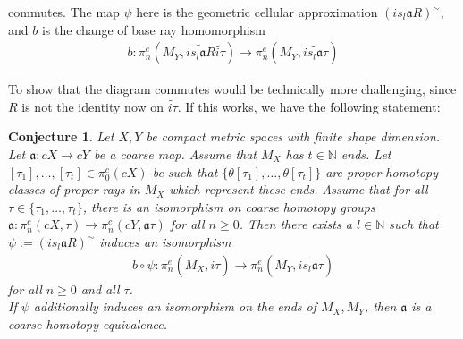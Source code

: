 \documentclass[a4paper,11pt]{article}
\theoremstyle{definition}
\theoremstyle{plain}
\newtheorem{conjecture}[definition]{Conjecture}
\theoremstyle{remark}
\begin{document}
{\begin{figure}[H]
\center
{}
\end{figure}
commutes. The map $\psi$ here is the geometric cellular approximation $(is_{l}\mathfrak{a}R)^{\sim}$, and $b$ is the change of base ray homomorphism 
\begin{align*}
b: \pi_{n}^{e}(M_Y,\widetilde{is_{l}\mathfrak{a}R}\widetilde{i\tau}) \rightarrow \pi_{n}^{e}(M_Y,\widetilde{is_{l}\mathfrak{a}\tau}) 
\end{align*}

To show that the diagram commutes would be technically more challenging, since $R$ is not the identity now on $\widetilde{i\tau}$. If this works, we have the following statement:\\


\begin{conjecture} Let $X,Y$ be compact metric spaces with finite shape dimension. Let $\mathfrak{a}: cX\rightarrow cY$ be a coarse map. Assume that $M_{X}$ has $t\in \mathbb{N}$ ends. Let $[\tau_{1}],\dots,[\tau_{t}]\in \pi_{0}^{c}(cX)$ be such that $\{\theta[\tau_{1}],\dots, \theta[\tau_{t}]\}$ are proper homotopy classes of proper rays in $M_{X}$ which represent these ends. Assume that for all $\tau\in \{\tau_{1},\dots, \tau_{t}\}$, there is an isomorphism on coarse homotopy groups $\mathfrak{a}:\pi_{n}^{c}(cX,\tau)\rightarrow \pi_{n}^{c}(cY,\mathfrak{a}\tau)$ for all $n\geq 0$. Then there exists a $l\in \mathbb{N}$ such that $\psi:=(is_{l}\mathfrak{a}R)^{\sim}$ induces an isomorphism 
\begin{align*}
b\circ \psi: \pi_{n}^{e}(M_X,\widetilde{i\tau}) \rightarrow \pi_{n}^{e}(M_Y,\widetilde{is_{l}\mathfrak{a}\tau}) 
\end{align*} 
for all $n\geq 0$ and all $\tau$. \\

If $\psi$ additionally induces an isomorphism on the ends of $M_{X},M_{Y}$, then $\mathfrak{a}$ is a coarse homotopy equivalence. 
\end{conjecture}

}
\end{document}
